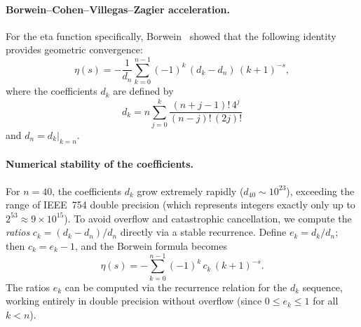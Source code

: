 \paragraph{Borwein--Cohen--Villegas--Zagier acceleration.}
For the eta function specifically, Borwein~\cite{borwein2000} showed that the following
identity provides geometric convergence:
\begin{equation}\label{eq:borwein}
  \eta(s) = -\frac{1}{d_n}\sum_{k=0}^{n-1}(-1)^k\,(d_k - d_n)\,(k+1)^{-s},
\end{equation}
where the coefficients $d_k$ are defined by
\begin{equation}\label{eq:borwein-dk}
  d_k = n\sum_{j=0}^{k} \frac{(n+j-1)!\,4^j}{(n-j)!\,(2j)!}
\end{equation}
and $d_n = d_k|_{k=n}$.

\paragraph{Numerical stability of the coefficients.}
For $n = 40$, the coefficients $d_k$ grow extremely rapidly ($d_{40} \sim 10^{23}$),
exceeding the range of IEEE~754 double precision (which represents integers exactly only
up to $2^{53} \approx 9 \times 10^{15}$). To avoid overflow and catastrophic
cancellation, we compute the \emph{ratios} $c_k = (d_k - d_n)/d_n$ directly via a
stable recurrence. Define $e_k = d_k/d_n$; then $c_k = e_k - 1$, and the Borwein
formula becomes
\begin{equation}\label{eq:borwein-stable}
  \eta(s) = -\sum_{k=0}^{n-1}(-1)^k\,c_k\,(k+1)^{-s}.
\end{equation}
The ratios $e_k$ can be computed via the recurrence relation for the $d_k$ sequence,
working entirely in double precision without overflow (since $0 \le e_k \le 1$ for all
$k < n$).

